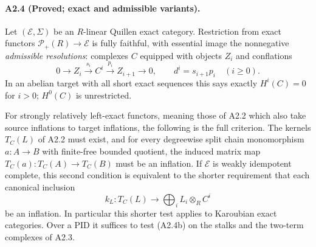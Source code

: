 \paragraph{A2.4 (Proved; exact and admissible variants).}
\label{A2.4}
Let $(\mathcal E,\Sigma)$ be an $R$-linear Quillen exact category.
Restriction from exact functors
$\mathcal P_+(R)\to\mathcal E$ is fully faithful, with essential image
the nonnegative \emph{admissible resolutions}: complexes $C$ equipped
with objects $Z_i$ and conflations
\[
 0\longrightarrow Z_i\xrightarrow{s_i}C^i
    \xrightarrow{p_i}Z_{i+1}\longrightarrow0,
 \qquad d^i=s_{i+1}p_i\quad(i\geq0).
 \tag{A2.4a}
\]
In an abelian target with all short exact sequences this says exactly
$H^i(C)=0$ for $i>0$; $H^0(C)$ is unrestricted.

For strongly relatively left-exact functors, meaning those of A2.2
which also take source inflations to target inflations, the following
is the full criterion.  The kernels $T_C(L)$ of A2.2 must exist, and
for every degreewise split chain monomorphism $a:A\to B$ with
finite-free bounded quotient, the induced matrix map
$T_C(a):T_C(A)\to T_C(B)$ must be an inflation.  If $\mathcal E$ is
weakly idempotent complete, this second condition is equivalent to the
shorter requirement that each canonical inclusion
\[
 k_L:T_C(L)\longrightarrow\bigoplus_i L_i\otimes_R C^i
 \tag{A2.4b}
\]
be an inflation.  In particular this shorter test applies to
Karoubian exact categories.  Over a PID it suffices to test (A2.4b) on
the stalks and the two-term complexes of A2.3.

